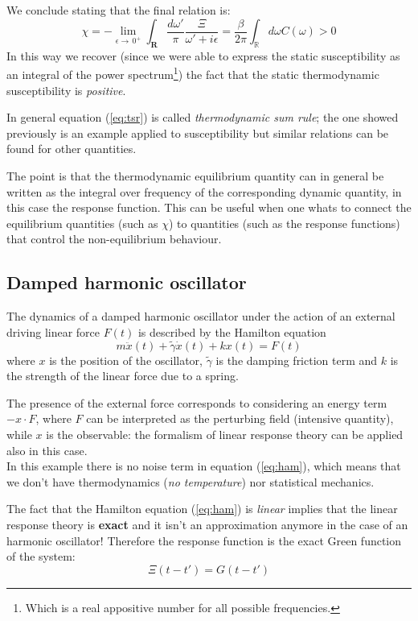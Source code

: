 \documentclass[\main/main.tex]{subfiles}
\begin{document}
We conclude stating that the final relation is:
\begin{equation}
    \chi=-\lim_{\epsilon\to\,0^+}\int_{\mathbf{R}}\frac{d\omega'}{\pi}\frac{\Xi}{\omega'+i\epsilon} = \frac{\beta}{2\pi}\int_{\mathbb{R}}d\omega C(\omega)>0
    \label{eq:tsr}
\end{equation}
In this way we recover (since we were able to express the static susceptibility as an integral of the power spectrum\footnote{Which is a real appositive number for all possible frequencies.})  the fact that the static thermodynamic susceptibility is \textit{positive}.

In general equation (\ref{eq:tsr}) is called \textit{thermodynamic sum rule}; the one showed previously is an example applied to susceptibility but similar relations can be found for other quantities.

The point is that the thermodynamic equilibrium quantity can in general be written as the integral over frequency of the corresponding dynamic quantity, in this case the response function. This can be useful when one whats to connect the equilibrium quantities (such as $\chi$) to quantities (such as the response  functions) that control the non-equilibrium behaviour. 

\subsection{Damped harmonic oscillator}
The dynamics of a damped harmonic oscillator under the action of an external driving linear force $F(t)$ is described by the Hamilton equation
\begin{equation}
m \ddot{x}(t)+\tilde{\gamma} \dot{x}(t)+k x(t)=F(t)    
\label{eq:ham}
\end{equation}
where $x$ is the position of the oscillator, $\tilde{\gamma}$ is the damping friction term and $k$ is the strength of the linear force due to a spring.

The presence of the external force corresponds to considering an energy term $-x \cdot F$, where $F$ can be interpreted as the perturbing field (intensive quantity), while $x$ is the observable: the formalism of linear response theory can be applied also in this case. \\

In this example there is no noise term in equation (\ref{eq:ham}), which means that we don't have thermodynamics (\textit{no temperature}) nor statistical mechanics. 

The fact that the Hamilton equation (\ref{eq:ham}) is \textit{linear} implies that the linear response theory is \textbf{exact} and it isn't an approximation anymore in the case of an harmonic oscillator!
Therefore the response function is the exact Green function of the system:
\[
\Xi(t-t')=G(t-t')
\]
\end{document}
